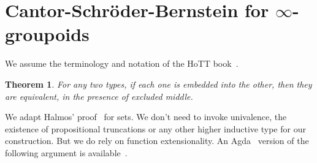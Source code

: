 \documentclass{article}
\newtheorem{theorem}{Theorem}[section]
\theoremstyle{definition}
\begin{document}
\section{Cantor-Schr\"oder-Bernstein for $\infty$-groupoids}

We assume the terminology and notation of the HoTT book~\cite{hottbook}.

\begin{theorem}
For any two types, if each one is embedded into the
other, then they are equivalent, in the presence of excluded middle.
\end{theorem}

We adapt Halmos' proof~\cite{MR0453532} for sets. We don't need to
invoke univalence, the existence of propositional truncations or any
other higher inductive type for our construction. But we do rely on
function extensionality. An Agda~\cite{agda} version of the following
argument is available~\cite{2019arXiv191100580H,escardo:csb}.
\end{document}
